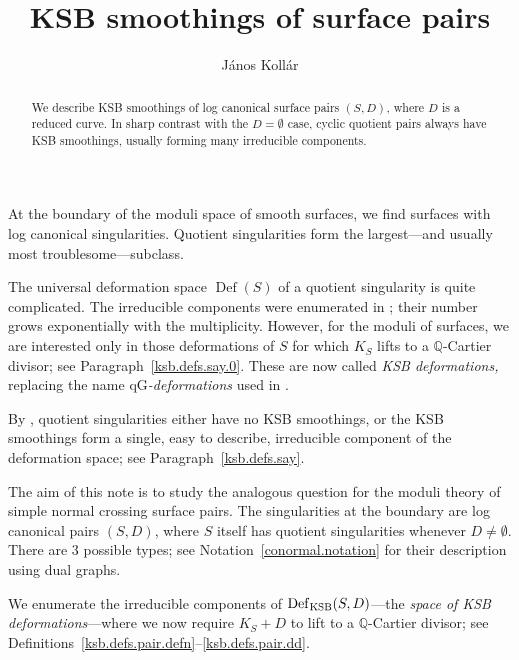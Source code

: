 \documentclass{amsart}
\theoremstyle{definition}
\theoremstyle{remark}
\newcommand{\q}[0]{{\mathbb Q}}
\newcommand{\qg}[0]{\ensuremath{\mathrm{qG}}}
\newcommand{\defsp}[0]{\operatorname{Def}}
\begin{document}


\title{KSB smoothings of surface pairs}
        \author{J\'anos Koll\'ar}

        \begin{abstract}  We describe KSB smoothings of log canonical surface  pairs  $(S, D)$, where $D$ is a reduced curve. In sharp contrast with the $D=\emptyset$ case, cyclic quotient  pairs  always have
          KSB smoothings, usually forming many irreducible components.
        \end{abstract}



        \maketitle

        \tableofcontents

At the boundary of the moduli space of smooth surfaces, we find surfaces with log canonical singularities. Quotient singularities form the largest---and usually most troublesome---subclass.

 The universal deformation space $\defsp(S)$ of a quotient singularity is quite complicated. The irreducible components were enumerated in \cite{ksb, MR1129040}; their number grows exponentially with the multiplicity. 
However, for the moduli of surfaces, we are interested only in those deformations of $S$ for which $K_S$ lifts to a $\q$-Cartier divisor; see Paragraph~\ref{ksb.defs.say.0}.
These are now called {\it KSB deformations,} replacing the name  {\it  \qg-deformations} used in \cite{ksb}. 

By \cite[3.10]{ksb},  quotient singularities either have no KSB smoothings, or 
the  KSB smoothings form a single,  easy to describe, irreducible component of the deformation space;  see Paragraph~\ref{ksb.defs.say}.




The aim of this note is to study the analogous question for  the moduli theory of  simple normal crossing   surface pairs. 
The singularities at the boundary are log canonical pairs $(S, D)$, where $S$ itself has quotient singularities whenever $D\neq \emptyset$. There are 3 possible types; see  Notation~\ref{conormal.notation} for their description using dual graphs.

We enumerate the irreducible components of $\defsp_{\rm KSB}(S,D)$---the {\it space of KSB deformations}---where we now require $K_S+D$ to lift to a $\q$-Cartier divisor; see Definitions~\ref{ksb.defs.pair.defn}--\ref{ksb.defs.pair.dd}.
\end{document}
